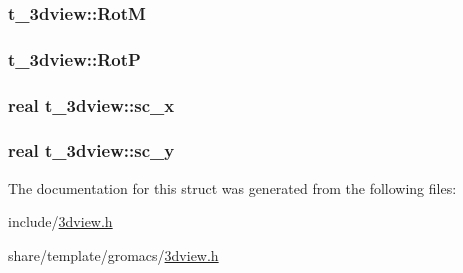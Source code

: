 \hypertarget{structt__3dview_a6e809b0ef658ee3ad10bba9f9020fd50}{
\subsubsection[{\-Rot\-M}]{ {\bf t\-\_\-3dview\-::\-Rot\-M}}}\label{structt__3dview_a6e809b0ef658ee3ad10bba9f9020fd50}
\hypertarget{structt__3dview_a6d8a5f65a6569fbb7ea927d910c7f3cb}{
\subsubsection[{\-Rot\-P}]{ {\bf t\-\_\-3dview\-::\-Rot\-P}}}\label{structt__3dview_a6d8a5f65a6569fbb7ea927d910c7f3cb}
\hypertarget{structt__3dview_a950f9b435e514664a285cf6522effba2}{
\subsubsection[{sc\-\_\-x}]{\setlength{\rightskip}{0pt plus 5cm}real {\bf t\-\_\-3dview\-::sc\-\_\-x}}}\label{structt__3dview_a950f9b435e514664a285cf6522effba2}
\hypertarget{structt__3dview_a3e94d99210078e12b45ab31247fea8cc}{
\subsubsection[{sc\-\_\-y}]{\setlength{\rightskip}{0pt plus 5cm}real {\bf t\-\_\-3dview\-::sc\-\_\-y}}}\label{structt__3dview_a3e94d99210078e12b45ab31247fea8cc}


\-The documentation for this struct was generated from the following files\-:\begin{DoxyCompactItemize}
\item 
include/\hyperlink{include_23dview_8h}{3dview.\-h}\item 
share/template/gromacs/\hyperlink{share_2template_2gromacs_23dview_8h}{3dview.\-h}\end{DoxyCompactItemize}
